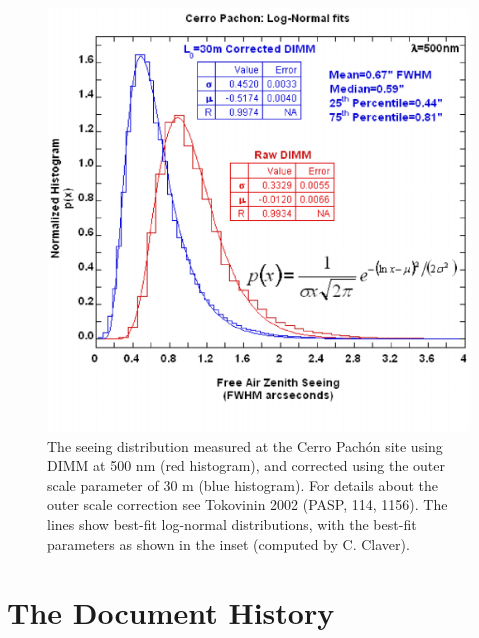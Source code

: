 \begin{figure}[h!]\centering
\includegraphics[width=13cm]{CerroPachonSeeing}
\caption{The seeing distribution measured at the Cerro Pach\'{o}n site using DIMM at
500 nm (red histogram), and corrected using the outer scale parameter of 30 m
(blue histogram). For details about the outer scale correction see Tokovinin
2002 (PASP, 114, 1156). The lines show best-fit log-normal distributions, with
the best-fit parameters as shown in the inset (computed by C. Claver).}
\end{figure}




\clearpage
\section{The Document History}

